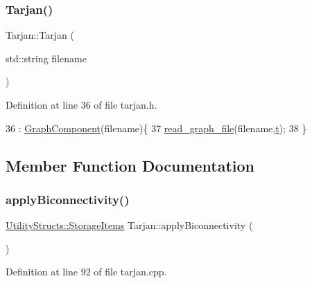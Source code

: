 \subsubsection{\texorpdfstring{Tarjan()}{Tarjan()}\hspace{0.1cm}{\footnotesize\ttfamily [2/2]}}
{\footnotesize\ttfamily Tarjan\+::\+Tarjan (\begin{DoxyParamCaption}\item[{std\+::string}]{filename }\end{DoxyParamCaption})\hspace{0.3cm}{\ttfamily [inline]}}



Definition at line 36 of file tarjan.\+h.


\begin{DoxyCode}
36                               : \hyperlink{class_graph_component_a35c4a6e5c6f28751b1bd6c451cc07957}{GraphComponent}(filename)\{
37         \hyperlink{class_graph_component_a680363eab8b992d739f055bd484bc000}{read\_graph\_file}(filename,\hyperlink{class_tarjan_a54b0703f885a3514ea0bf4cdbc7fdaad}{t});
38     \}
\end{DoxyCode}


\subsection{Member Function Documentation}
\mbox{\label{class_tarjan_a4be3dec188e347b54a90cd5f37abc268}} 
\subsubsection{\texorpdfstring{apply\+Biconnectivity()}{applyBiconnectivity()}}
{\footnotesize\ttfamily \hyperlink{struct_utility_structs_1_1_storage_items}{Utility\+Structs\+::\+Storage\+Items} Tarjan\+::apply\+Biconnectivity (\begin{DoxyParamCaption}{ }\end{DoxyParamCaption})}



Definition at line 92 of file tarjan.\+cpp.


